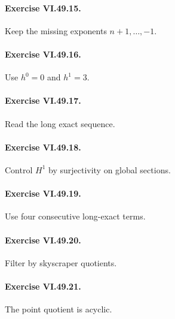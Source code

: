 \paragraph{Exercise VI.49.15.}
\begin{hint}
Keep the missing exponents \(n+1,\ldots,-1\).
\end{hint}

\paragraph{Exercise VI.49.16.}
\begin{hint}
Use \(h^0=0\) and \(h^1=3\).
\end{hint}

\paragraph{Exercise VI.49.17.}
\begin{hint}
Read the long exact sequence.
\end{hint}

\paragraph{Exercise VI.49.18.}
\begin{hint}
Control \(H^1\) by surjectivity on global sections.
\end{hint}

\paragraph{Exercise VI.49.19.}
\begin{hint}
Use four consecutive long-exact terms.
\end{hint}

\paragraph{Exercise VI.49.20.}
\begin{hint}
Filter by skyscraper quotients.
\end{hint}

\paragraph{Exercise VI.49.21.}
\begin{hint}
The point quotient is acyclic.
\end{hint}

